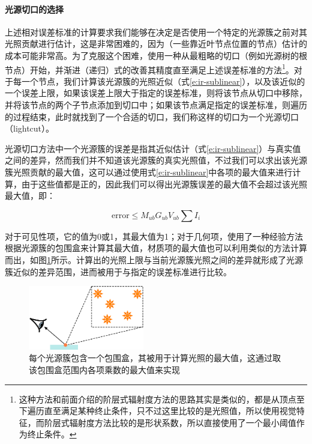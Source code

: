 \paragraph{光源切口的选择}
上述相对误差标准的计算要求我们能够在决定是否使用一个特定的光源簇之前对其光照贡献进行估计，这是非常困难的，因为（一些靠近叶节点位置的节点）估计的成本可能非常高。为了克服这个困难，\cite{a:Lightcuts:AScalableApproachtoIllumination}使用一种从最粗略的切口（例如光源树的根节点）开始，并渐进（递归）式的改善其精度直至满足上述误差标准的方法\footnote{这种方法和前面介绍的阶层式辐射度方法的思路其实是类似的，都是从顶点至下遍历直至满足某种终止条件，只不过这里比较的是光照值，所以使用视觉特征，而阶层式辐射度方法比较的是形状系数，所以直接使用了一个最小阈值作为终止条件。}。对于每一个节点，我们计算该光源簇的光照近似（式\ref{e:ir-sublinear}），以及该近似的一个误差上限，如果该误差上限大于指定的误差标准，则将该节点从切口中移除，并将该节点的两个子节点添加到切口中；如果该节点满足指定的误差标准，则遍历的过程结束，此时就找到了一个合适的切口，我们称这样的切口为一个光源切口（lightcut）。

光源切口方法中一个光源簇的误差是指其近似估计（式\ref{e:ir-sublinear}）与真实值之间的差异，然而我们并不知道该光源簇的真实光照值，不过我们可以求出该光源簇光照贡献的最大值，这可以通过使用式\ref{e:ir-sublinear}中各项的最大值来进行计算，由于这些值都是正的，因此我们可以得出光源簇误差的最大值不会超过该光照最大值，即：

\begin{equation}
	\text{error}\leq M_{ub}G_{ub}V_{ub}\sum I_i
\end{equation}

对于可见性项，它的值为0或1，其最大值为1；对于几何项，\cite{a:Lightcuts:AScalableApproachtoIllumination}使用了一种经验方法根据光源簇的包围盒来计算其最大值，材质项的最大值也可以利用类似的方法计算而出，如图\ref{f:ir-light-cluster-error-bound}所示。计算出的光照上限与当前光源簇光照之间的差异就形成了光源簇近似的差异范围，进而被用于与指定的误差标准进行比较。

\begin{figure}
	\sidecaption
	\includegraphics[width=0.45\textwidth]{figures/ir/light-cluster-error-bound}
	\caption{每个光源簇包含一个包围盒，其被用于计算光照的最大值，这通过取该包围盒范围内各项乘数的最大值来实现}
	\label{f:ir-light-cluster-error-bound}
\end{figure}

